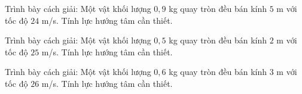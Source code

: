 \begin{bt}
Trình bày cách giải: Một vật khối lượng $0,9$ kg quay tròn đều bán kính $5$ m với tốc độ $24$ m/s. Tính lực hướng tâm cần thiết.
\end{bt}

\begin{bt}
Trình bày cách giải: Một vật khối lượng $0,5$ kg quay tròn đều bán kính $2$ m với tốc độ $25$ m/s. Tính lực hướng tâm cần thiết.
\end{bt}

\begin{bt}
Trình bày cách giải: Một vật khối lượng $0,6$ kg quay tròn đều bán kính $3$ m với tốc độ $26$ m/s. Tính lực hướng tâm cần thiết.
\end{bt}
